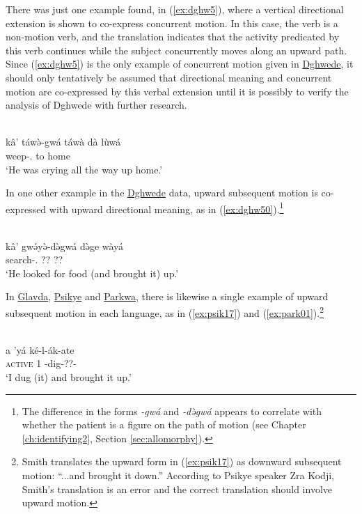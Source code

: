 There was just one example found, in (\ref{ex:dghw5}), where a vertical directional extension is shown to co-express concurrent motion. In this case, the verb is a non-motion verb, and the translation indicates that the activity predicated by this verb continues while the subject concurrently moves along an upward path. Since (\ref{ex:dghw5}) is the only example of concurrent motion given in \hyperref[dghw]{Dghwede}, it should only tentatively be assumed that directional meaning and concurrent motion are co-expressed by this verbal extension until it is possibly to verify the analysis of Dghwede with further research. 

\ea\label{ex:dghw5}
 \\
\gll kâ' táwə̀-gwá táwà dà lùwá \\
 weep-.  to home \\
\glt `He was crying all the way up home.'
\z

In one other example in the \hyperref[dghw]{Dghwede} data, upward subsequent motion is co-expressed with upward directional meaning, as in (\ref{ex:dghw50}).\footnote{The difference in the forms \textit{-gwá} and \textit{-də̀gwá} appears to correlate with whether the patient is a figure on the path of motion (see Chapter \ref{ch:identifying2}, Section \ref{sec:allomorphy}).} 

\ea\label{ex:dghw50}
 \\
\gll kâ' gwə́yə̀-də̀gwá də̀ge wàyá	\\
 search-. ?? ??		\\
\glt `He looked for food (and brought it) up.'
\z 

In \hyperref[glav]{Glavda}, \hyperref[psik]{Psikye} and \hyperref[park]{Parkwa}, there is likewise a single example of upward subsequent motion in each language, as in (\ref{ex:psik17}) and (\ref{ex:park01}).\footnote{Smith translates the upward form in (\ref{ex:psik17}) as downward subsequent motion: ``...and brought it down.'' According to Psikye speaker Zra Kodji, Smith's translation is an error and the correct translation should involve upward motion.}

\ea\label{ex:psik17}
 \\
\gll a 'yá ké-l-ák-ate \\
\textsc{active} 1 -dig-??-	\\
\glt `I dug (it) and brought it up.'

